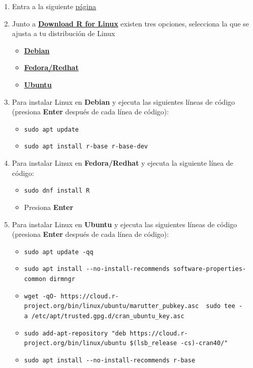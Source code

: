 \documentclass[
  spanish,
  12pt,
  letterpaper,
  DIV=11,
  numbers=noendperiod]{scrreprt}
\begin{document}
\begin{enumerate}
\def\labelenumi{\arabic{enumi}.}
\item
  Entra a la siguiente \href{https://cloud.r-project.org/}{página}
\item
  Junto a \ul{\textbf{Download R for Linux}} existen tres opciones,
  selecciona la que se ajusta a tu distribución de Linux

  \begin{itemize}
  \item
    \ul{\textbf{Debian}}
  \item
    \ul{\textbf{Fedora/Redhat}}
  \item
    \ul{\textbf{Ubuntu}}
  \end{itemize}
\item
  Para instalar Linux en \textbf{Debian} y ejecuta las siguientes líneas
  de código (presiona \textbf{Enter} después de cada línea de código):

  \begin{itemize}
  \item
    \texttt{sudo\ apt\ update}
  \item
    \texttt{sudo\ apt\ install\ r-base\ r-base-dev}
  \end{itemize}
\item
  Para instalar Linux en \textbf{Fedora/Redhat} y ejecuta la siguiente
  línea de código:

  \begin{itemize}
  \item
    \texttt{sudo\ dnf\ install\ R}
  \item
    Presiona \textbf{Enter}
  \end{itemize}
\item
  Para instalar Linux en \textbf{Ubuntu} y ejecuta las siguientes líneas
  de código (presiona \textbf{Enter} después de cada línea de código):

  \begin{itemize}
  \item
    \texttt{sudo\ apt\ update\ -qq}
  \item
    \texttt{sudo\ apt\ install\ -\/-no-install-recommends\ software-properties-common\ dirmngr}
  \item
    \texttt{wget\ -qO-\ https://cloud.r-project.org/bin/linux/ubuntu/marutter\_pubkey.asc\ \textbar{}\ sudo\ tee\ -a\ /etc/apt/trusted.gpg.d/cran\_ubuntu\_key.asc}
  \item
    \texttt{sudo\ add-apt-repository\ "deb\ https://cloud.r-project.org/bin/linux/ubuntu\ \$(lsb\_release\ -cs)-cran40/"}
  \item
    \texttt{sudo\ apt\ install\ -\/-no-install-recommends\ r-base}
  \end{itemize}
\end{enumerate}
\end{document}
